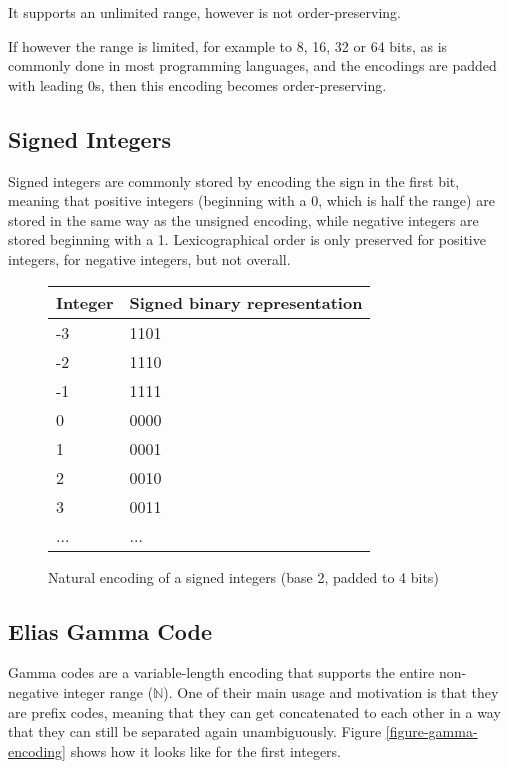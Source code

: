 \documentclass{acm_proc_article-sp}
\begin{document}
It supports an unlimited range, however is not order-preserving.

If however the range is limited, for example to 8, 16, 32 or 64 bits, as is commonly done in most programming languages, and the encodings are padded with leading 0s, then this encoding becomes order-preserving.

\subsection{Signed Integers}

Signed integers are commonly stored by encoding the sign in the first bit, meaning that positive integers (beginning with a 0, which is half the range) are stored in the same way as the unsigned encoding, while negative integers are stored beginning with a 1. Lexicographical order is only preserved for positive integers, for negative integers, but not overall.

\begin{figure}
\caption{Natural encoding of a signed integers (base 2, padded to 4 bits)}
\label{figure-natural-signed-encoding}
\center
\begin{tabular}{|l|l|}
\hline
Integer & Signed binary representation \\
\hline
-3 & 1101 \\
\hline
-2 & 1110 \\
\hline
-1 & 1111 \\
\hline
0 & 0000 \\
\hline
1 & 0001 \\
\hline
2 & 0010 \\
\hline
3 & 0011 \\
\hline
... & ... \\
\hline
\end{tabular}
\end{figure}

\subsection{Elias Gamma Code}
\label{section-gamma-code}

Gamma codes are a variable-length encoding that supports the entire non-negative integer range ($\mathbb{N}$). One of their main usage and motivation is that they are prefix codes, meaning that they can get concatenated to each other in a way that they can still be separated again unambiguously. Figure \ref{figure-gamma-encoding} shows how it looks like for the first integers.
\end{document}
